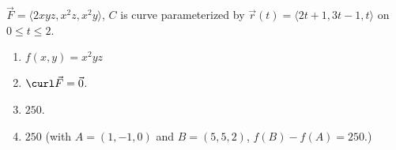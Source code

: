 {$\vec F = \langle 2xyz,x^2z,x^2y\rangle$, $C$ is curve parameterized by $\vec r(t) = \langle 2t+1,3t-1,t\rangle$ on $0\leq t\leq 2$. 
}
{\begin{enumerate}
\item		$f(x,y) = x^2yz$
\item	$\curl \vec F = \vec 0$.
\item		$250$.%
\item	$250$ (with $A = (1,-1,0)$ and $B = (5,5,2)$, $f(B) - f(A) = 250$.)
\end{enumerate}
}
